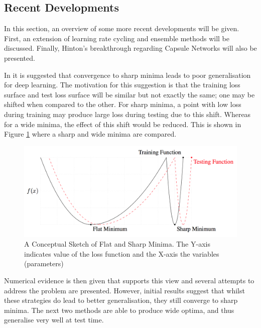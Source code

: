 \subsection{Recent Developments}\label{subsec:recent_improvements}

In this section, an overview of some more recent developments will be given.
First, an extension of learning rate cycling and ensemble methods will be discussed.
Finally, Hinton's breakthrough regarding Capsule Networks will also be presented.

In \cite{Keskar_Mudigere_Nocedal_Smelyanskiy_Tang_2016} it is suggested that convergence to sharp minima leads to poor generalisation for deep learning.
The motivation for this suggestion is that the training loss surface and test loss surface will be similar but not exactly the same; one may be shifted when compared to the other.
For sharp minima, a point with low loss during training may produce large loss during testing due to this shift.
Whereas for a wide minima, the effect of this shift would be reduced.
This is shown in Figure \ref{fig:wide_optima} where a sharp and wide minima are compared.

\begin{figure}[hbtp!]
    \centering
    \includegraphics[width=\textwidth]{./img/Wide_optima.png}
    \caption{A Conceptual Sketch of Flat and Sharp Minima. The Y-axis indicates value of the loss function and the X-axis the variables (parameters) \cite{Keskar_Mudigere_Nocedal_Smelyanskiy_Tang_2016}}
    \label{fig:wide_optima}
\end{figure}

Numerical evidence is then given that supports this view and several attempts to address the problem are presented.
However, initial results suggest that whilst these strategies do lead to better generalisation, they still converge to sharp minima.
The next two methods are able to produce wide optima, and thus generalise very well at test time.

